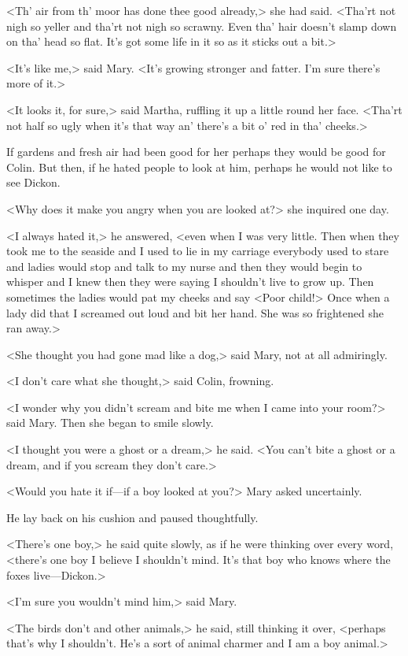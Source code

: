 <Th' air from th' moor has done thee good already,> she had said. <Tha'rt not nigh so yeller and tha'rt not nigh so scrawny. Even tha' hair doesn't slamp down on tha' head so flat. It's got some life in it so as it sticks out a bit.>

<It's like me,> said Mary. <It's growing stronger and fatter. I'm sure there's more of it.>

<It looks it, for sure,> said Martha, ruffling it up a little round her face. <Tha'rt not half so ugly when it's that way an' there's a bit o' red in tha' cheeks.>

If gardens and fresh air had been good for her perhaps they would be good for Colin. But then, if he hated people to look at him, perhaps he would not like to see Dickon.

<Why does it make you angry when you are looked at?> she inquired one day.

<I always hated it,> he answered, <even when I was very little. Then when they took me to the seaside and I used to lie in my carriage everybody used to stare and ladies would stop and talk to my nurse and then they would begin to whisper and I knew then they were saying I shouldn't live to grow up. Then sometimes the ladies would pat my cheeks and say <Poor child!> Once when a lady did that I screamed out loud and bit her hand. She was so frightened she ran away.>

<She thought you had gone mad like a dog,> said Mary, not at all admiringly.

<I don't care what she thought,> said Colin, frowning.

<I wonder why you didn't scream and bite me when I came into your room?> said Mary. Then she began to smile slowly.

<I thought you were a ghost or a dream,> he said. <You can't bite a ghost or a dream, and if you scream they don't care.>

<Would you hate it if—if a boy looked at you?> Mary asked uncertainly.

He lay back on his cushion and paused thoughtfully.

<There's one boy,> he said quite slowly, as if he were thinking over every word, <there's one boy I believe I shouldn't mind. It's that boy who knows where the foxes live—Dickon.>

<I'm sure you wouldn't mind him,> said Mary.

<The birds don't and other animals,> he said, still thinking it over, <perhaps that's why I shouldn't. He's a sort of animal charmer and I am a boy animal.>

